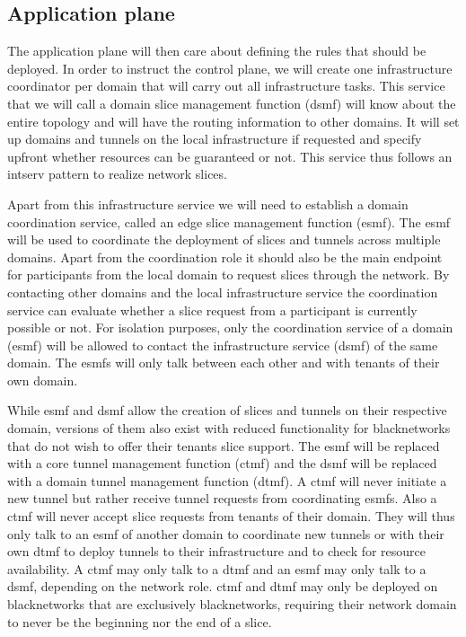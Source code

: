 \subsection{Application plane}
The application plane will then care about defining the rules that should be deployed. In order to instruct the control plane, we will create one infrastructure coordinator per domain that will carry out all infrastructure tasks. This service that we will call a domain slice management function (\acrshort{dsmf}) will know about the entire topology and will have the routing information to other domains. It will set up domains and tunnels on the local infrastructure if requested and specify upfront whether resources can be guaranteed or not. This service thus follows an \acrshort{intserv} pattern to realize network slices.

Apart from this infrastructure service we will need to establish a domain coordination service, called an edge slice management function (\acrshort{esmf}). The \acrshort{esmf} will be used to coordinate the deployment of slices and tunnels across multiple domains. Apart from the coordination role it should also be the main endpoint for participants from the local domain to request slices through the network. By contacting other domains and the local infrastructure service the coordination service can evaluate whether a slice request from a participant is currently possible or not. For isolation purposes, only the coordination service of a domain (\acrshort{esmf}) will be allowed to contact the infrastructure service (\acrshort{dsmf}) of the same domain. The \acrshort{esmf}s will only talk between each other and with tenants of their own domain.

While \acrshort{esmf} and \acrshort{dsmf} allow the creation of slices and tunnels on their respective domain, versions of them also exist with reduced functionality for \gls{blacknetwork}s that do not wish to offer their tenants slice support. The \acrshort{esmf} will be replaced with a core tunnel management function (\acrshort{ctmf}) and the \acrshort{dsmf} will be replaced with a domain tunnel management function (\acrshort{dtmf}). A \acrshort{ctmf} will never initiate a new tunnel but rather receive tunnel requests from coordinating \acrshort{esmf}s. Also a \acrshort{ctmf} will never accept slice requests from tenants of their domain. They will thus only talk to an \acrshort{esmf} of another domain to coordinate new tunnels or with their own \acrshort{dtmf} to deploy tunnels to their infrastructure and to check for resource availability. A \acrshort{ctmf} may only talk to a \acrshort{dtmf} and an \acrshort{esmf} may only talk to a \acrshort{dsmf}, depending on the network role. \acrshort{ctmf} and \acrshort{dtmf} may only be deployed on \gls{blacknetwork}s that are exclusively \gls{blacknetwork}s, requiring their network domain to never be the beginning nor the end of a slice.

